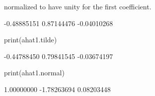 \documentclass[a4paper]{article}
\begin{document}
normalized to have unity for the first coefficient.
\begin{Schunk}
\begin{Soutput}
[1] -0.48885151  0.87144476 -0.04010268
\end{Soutput}
\begin{Sinput}
 print(ahat1.tilde)
\end{Sinput}
\begin{Soutput}
[1] -0.44788450  0.79841545 -0.03674197
\end{Soutput}
\begin{Sinput}
 print(ahat1.normal)
\end{Sinput}
\begin{Soutput}
[1]  1.00000000 -1.78263694  0.08203448
\end{Soutput}
\end{Schunk}
\end{document}
